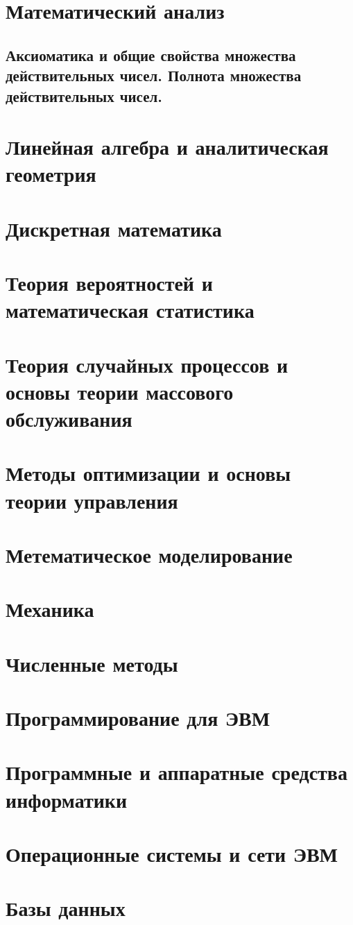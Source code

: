 \documentclass[12pt]{report}
\begin{document}
\tableofcontents

\chapter{Математический анализ}
\section{Аксиоматика и общие свойства множества действительных чисел. Полнота множества действительных чисел.}


\chapter{Линейная алгебра и аналитическая геометрия}

\chapter{Дискретная математика}

\chapter{Теория вероятностей и математическая статистика}

\chapter{Теория случайных процессов и основы теории массового обслуживания}

\chapter{Методы оптимизации и основы теории управления}

\chapter{Метематическое моделирование}

\chapter{Механика}

\chapter{Численные методы}

\chapter{Программирование для ЭВМ}

\chapter{Программные и аппаратные средства информатики}

\chapter{Операционные системы и сети ЭВМ}

\chapter{Базы данных}
\end{document}
